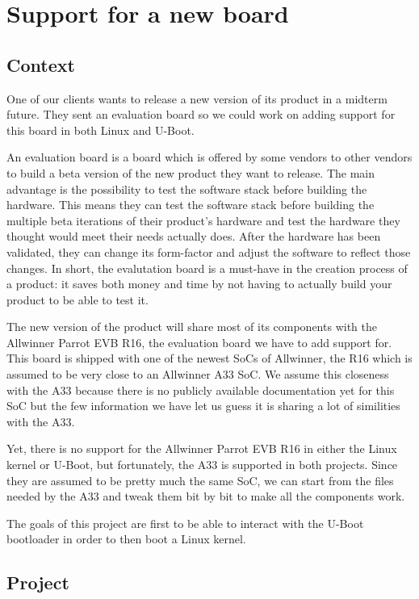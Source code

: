 \chapter{Support for a new board}

\section{Context}
One of our clients wants to release a new version of its product in a midterm future. They sent an evaluation board so we could work on adding support for this board in both Linux and U-Boot.

An evaluation board is a board which is offered by some vendors to other vendors to build a beta version of the new product they want to release. The main advantage is the possibility to test the software stack before building the hardware. This means they can test the software stack before building the multiple beta iterations of their product's hardware and test the hardware they thought would meet their needs actually does. After the hardware has been validated, they can change its form-factor and adjust the software to reflect those changes. In short, the evalutation board is a must-have in the creation process of a product: it saves both money and time by not having to actually build your product to be able to test it.

The new version of the product will share most of its components with the Allwinner Parrot EVB R16, the evaluation board we have to add support for. This board is shipped with one of the newest SoCs of Allwinner, the R16 which is assumed to be very close to an Allwinner A33 SoC. We assume this closeness with the A33 because there is no publicly available documentation yet for this SoC but the few information we have let us guess it is sharing a lot of similities with the A33.

Yet, there is no support for the Allwinner Parrot EVB R16 in either the Linux kernel or U-Boot, but fortunately, the A33 is supported in both projects. Since they are assumed to be pretty much the same SoC, we can start from the files needed by the A33 and tweak them bit by bit to make all the components work.

The goals of this project are first to be able to interact with the U-Boot bootloader in order to then boot a Linux kernel.

\section{Project}

